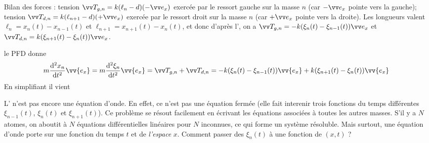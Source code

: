 \documentclass[12pt,fancy]{cours}
\begin{document}
\begin{liste}
  \item Bilan des forces : tension $\Vec{T}_{g,n} = k (\ell_n - d) (-\ex) $ exercée par le ressort gauche sur la masse $n$ (car $-\ex$ pointe vers la gauche); tension $\Vec{T}_{d,n} =  k (\ell_{n+1} - d) (+\ex) $ exercée par le ressort droit sur la masse $n$ (car $+\ex$ pointe vers la droite). Les longueurs valent $\ell_n = x_{n}(t)-x_{n-1}(t)$ et  $\ell_{n+1} = x_{n+1}(t)-x_{n}(t)$, et donc d’après l’, on a
  $\Vec{T}_{g,n} = -k (\xi_{n}(t)-\xi_{n-1}(t)) \ex $ et $\Vec{T}_{d,n} =  k (\xi_{n+1}(t)-\xi_{n}(t)) \ex $.
  \item le PFD donne
  \begin{equation}
  \begin{split}
  m\frac{\d^2 x_{n}}{\d t^2}\vv{e_x} = m\frac{\d^2 \xi_{n}}{\d t^2}\vv{e_x}   = \Vec{T}_{g,n} + \Vec{T}_{d,n}   =-k(\xi_{n}(t)-\xi_{n-1}(t))\vv{e_x} +k(\xi_{n+1}(t)-\xi_{n}(t))\vv{e_x}
  \end{split}
  \end{equation}
  En simplifiant il vient
\end{liste}
L’ n’est pas encore une équation d’onde. En effet, ce n’est pas une équation fermée (elle fait interenir trois fonctions du temps différentes $\xi_{n-1}(t)$, $\xi_{n}(t)$ et $\xi_{n+1}(t)$). Ce problème se résout facilement en écrivant les équations associées à toutes les autres masses. S’il y a $N$ atomes, on aboutit à $N$ équations différentielles linéaires pour $N$ inconnues, ce qui forme un système résoluble. Mais surtout, une équation d’onde porte sur une fonction du temps $t$ et de \emph{l’espace} $x$. Comment passer des $\xi_n(t)$ à une fonction de $(x,t)$ ?
%
%
\end{document}
